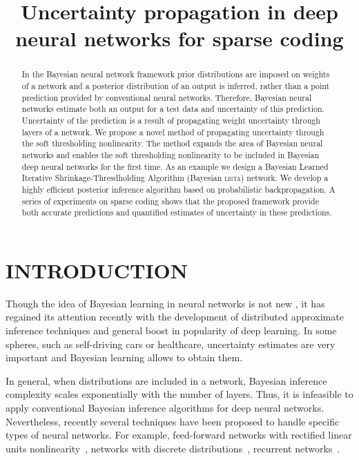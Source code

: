 \documentclass[letterpaper]{article}
\title{Uncertainty propagation in deep neural networks for sparse coding}
\author{} %
\begin{document}
\maketitle

\begin{abstract}
In the Bayesian neural network framework prior distributions are imposed on weights of a network and a posterior distribution of an output is inferred, rather than a point prediction provided by conventional neural networks. Therefore, Bayesian neural networks estimate both an output for a test data and uncertainty of this prediction. Uncertainty of the prediction is a result of propagating weight uncertainty through layers of a network. We propose a novel method of propagating uncertainty through the soft thresholding nonlinearity. The method expands the area of Bayesian neural networks and enables the soft thresholding nonlinearity to be included in Bayesian deep neural networks for the first time. As an example we design a Bayesian Learned Iterative Shrinkage-Thresdholding Algorithm (Bayesian \textsc{lista}) network. We develop a highly efficient posterior inference algorithm based on probabilistic backpropagation. A series of experiments on sparse coding shows that the proposed framework provide both accurate predictions and quantified estimates of uncertainty in these predictions.
\end{abstract}

\section{\uppercase{Introduction}}
Though the idea of Bayesian learning in neural networks is not new \citep{neal2012bayesian}, it has regained its attention recently with the development of distributed approximate inference techniques \citep{li2015stochastic, hoffman2013stochastic}  and general boost in popularity of deep learning. In some spheres, such as self-driving cars or healthcare, uncertainty estimates are very important and Bayesian learning allows to obtain them. 

In general, when distributions are included in a network, Bayesian inference complexity scales exponentially with the number of layers. Thus, it is infeasible to apply conventional Bayesian inference algorithms for deep neural networks. Nevertheless, recently several techniques have been proposed to handle specific types of neural networks. For example, feed-forward networks with rectified linear units nonlinearity~\citep{hernandez2015probabilistic}, networks with discrete distributions~\citep{soudry2014expectation}, recurrent networks~\citep{mcdermott2017bayesian}. 
\end{document}
